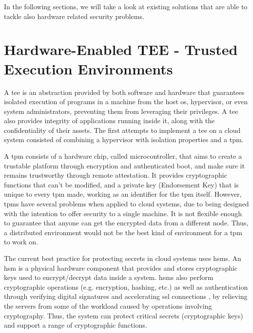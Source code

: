 In the following sections, we will take a look at existing solutions that are able to tackle also hardware related security problems.

\section{Hardware-Enabled TEE - Trusted Execution Environments}
\label{sec:tpm_hsm_tees}

A \gls{tee} is an abstraction provided by both software and hardware that guarantees isolated execution of programs in a machine from the host \gls{os}, hypervisor, or even system administrators, preventing them from leveraging their privileges. A \gls{tee} also provides integrity of applications running inside it, along with the confidentiality of their assets.
The first attempts to implement a \gls{tee} on a cloud system consisted of combining a hypervisor with isolation properties and a \gls{tpm}. 

A \gls{tpm} \cite{tpmPaper} consists of a hardware chip, called microcontroller, that aims to create a trustable platform through encryption and authenticated boot, and make sure it remains trustworthy through remote attestation. 
It provides cryptographic functions that can't be modified, and a private key (Endorsement Key) that is unique to every \gls{tpm} made, working as an identifier for the \gls{tpm} itself.
However, \gls{tpm}s have several problems when applied to cloud systems, due to being designed with the intention to offer security to a single machine. It is not flexible enough to guarantee that anyone can get the encrypted data from a different node.
Thus, a distributed environment would not be the best kind of environment for a \gls{tpm} to work on.

The current best practice for protecting secrets in  cloud systems uses \gls{hsm}s. 
An \gls{hsm} \cite{hsmPaper} is a physical hardware component that provides and stores cryptographic keys used to encrypt/decrypt data inside a system. \gls{hsm}s also perform cryptographic operations (e.g. encryption, hashing, etc.) as well as authentication through verifying digital signatures and accelerating \gls{ssl} connections \cite{hsmThesis}, by relieving the servers from some of the workload caused by operations involving cryptography. 
Thus, the system can protect critical secrets (cryptographic keys) and support a range of cryptographic functions.

